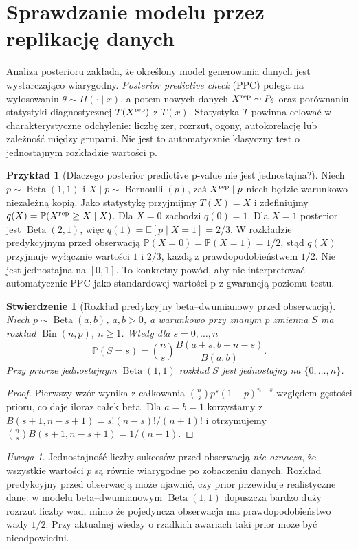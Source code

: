 \documentclass[11pt,a4paper,oneside]{report}
\numberwithin{equation}{chapter}
\theoremstyle{plain}
\newtheorem{stwierdzenie}[twierdzenie]{Stwierdzenie}
\theoremstyle{definition}
\newtheorem{przyklad}{Przykład}[chapter]
\theoremstyle{remark}
\newtheorem{uwaga}{Uwaga}[chapter]
\newcommand{\Prob}{\mathbb P}
\newcommand{\E}{\mathbb E}
\DeclareMathOperator{\Bin}{Bin}
\begin{document}
\section{Sprawdzanie modelu przez replikację danych}
Analiza posterioru zakłada, że określony model generowania
danych jest wystarczająco wiarygodny. \emph{Posterior predictive
check} (PPC) polega na wylosowaniu $\theta\sim\Pi(\cdot\mid x)$,
a potem nowych danych $X^{\rm rep}\sim P_\theta$ oraz
porównaniu statystyki diagnostycznej $T(X^{\rm rep})$ z $T(x)$.
Statystyka $T$ powinna celować w charakterystyczne odchylenie:
liczbę zer, rozrzut, ogony, autokorelację lub zależność między
grupami. Nie jest to automatycznie klasyczny test o jednostajnym
rozkładzie wartości p.

\begin{przyklad}[Dlaczego posterior predictive p-value nie jest jednostajna?]
Niech $p\sim\operatorname{Beta}(1,1)$ i
$X\mid p\sim\operatorname{Bernoulli}(p)$, zaś
$X^{\rm rep}\mid p$ niech będzie warunkowo niezależną kopią.
Jako statystykę przyjmijmy $T(X)=X$ i zdefiniujmy
$q(X)=\Prob(X^{\rm rep}\ge X\mid X)$.
Dla $X=0$ zachodzi $q(0)=1$. Dla $X=1$
posterior jest $\operatorname{Beta}(2,1)$, więc
$q(1)=\E[p\mid X=1]=2/3$.
W rozkładzie predykcyjnym przed obserwacją
$\Prob(X=0)=\Prob(X=1)=1/2$, stąd $q(X)$ przyjmuje
wyłącznie wartości $1$ i $2/3$, każdą z prawdopodobieństwem
$1/2$. Nie jest jednostajna na $[0,1]$.
To konkretny powód, aby nie interpretować automatycznie PPC
jako standardowej wartości p z gwarancją poziomu testu.
\end{przyklad}

\begin{stwierdzenie}[Rozkład predykcyjny beta--dwumianowy przed obserwacją]
\label{prop:prior-predictive-betabinomial}
Niech $p\sim\operatorname{Beta}(a,b)$, $a,b>0$,
a warunkowo przy znanym $p$ zmienna $S$ ma rozkład
$\Bin(n,p)$, $n\ge1$. Wtedy dla $s=0,\ldots,n$
\[
\Prob(S=s)=\binom ns\frac{B(a+s,b+n-s)}{B(a,b)}.
\]
Przy priorze jednostajnym $\operatorname{Beta}(1,1)$
rozkład $S$ jest jednostajny na $\{0,\ldots,n\}$.
\end{stwierdzenie}
\begin{proof}
Pierwszy wzór wynika z całkowania
$\binom ns p^s(1-p)^{n-s}$ względem gęstości prioru,
co daje iloraz całek beta. Dla $a=b=1$ korzystamy
z $B(s+1,n-s+1)=s!(n-s)!/(n+1)!$ i otrzymujemy
$\binom ns B(s+1,n-s+1)=1/(n+1)$.
\end{proof}
\begin{uwaga}
Jednostajność liczby sukcesów przed obserwacją \emph{nie oznacza},
że wszystkie wartości $p$ są równie wiarygodne po zobaczeniu danych.
Rozkład predykcyjny przed obserwacją może ujawnić, czy prior
przewiduje realistyczne dane: w modelu beta--dwumianowym
$\operatorname{Beta}(1,1)$ dopuszcza bardzo duży rozrzut liczby
wad, mimo że pojedyncza obserwacja ma prawdopodobieństwo
wady $1/2$. Przy aktualnej wiedzy o rzadkich awariach
taki prior może być nieodpowiedni.
\end{uwaga}
\end{document}
